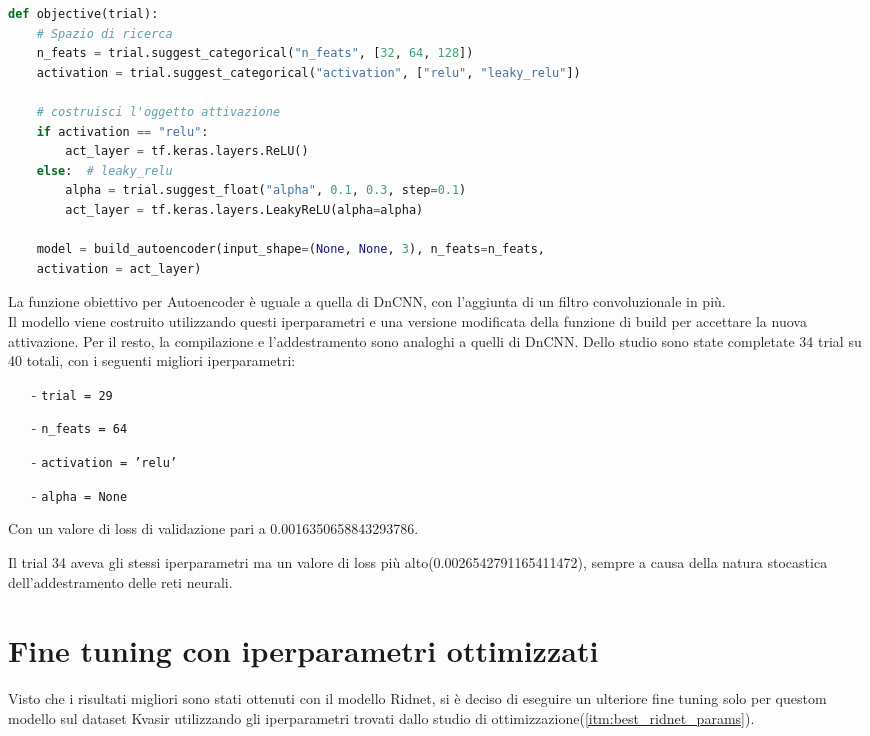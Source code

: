 \documentclass[12pt,a4paper,openright,twoside]{book}
\begin{document}
\begin{lstlisting}[language=Python, caption={Definizione della funzione obiettivo per Autoencoder}, label={lst:autoen_optuna_obj}]
def objective(trial):
    # Spazio di ricerca
    n_feats = trial.suggest_categorical("n_feats", [32, 64, 128])
    activation = trial.suggest_categorical("activation", ["relu", "leaky_relu"])

    # costruisci l'oggetto attivazione
    if activation == "relu":
        act_layer = tf.keras.layers.ReLU()
    else:  # leaky_relu
        alpha = trial.suggest_float("alpha", 0.1, 0.3, step=0.1)
        act_layer = tf.keras.layers.LeakyReLU(alpha=alpha)

    model = build_autoencoder(input_shape=(None, None, 3), n_feats=n_feats,
    activation = act_layer)
\end{lstlisting}
La funzione obiettivo per Autoencoder è uguale a quella di DnCNN, con l'aggiunta di un filtro convoluzionale in più.\\
Il modello viene costruito utilizzando questi iperparametri e una versione modificata della funzione di build per accettare la nuova attivazione.
Per il resto, la compilazione e l'addestramento sono analoghi a quelli di DnCNN.
Dello studio sono state completate 34 trial su 40 totali, con i seguenti migliori iperparametri:
\begin{itemize}
    \item [-] \texttt{trial = 29}
    \item [-] \texttt{n\_feats = 64}
    \item [-] \texttt{activation = 'relu'}
    \item [-] \texttt{alpha = None}
\end{itemize}
Con un valore di loss di validazione pari a 0.0016350658843293786.

Il trial 34 aveva gli stessi iperparametri ma un valore di loss più alto(0.0026542791165411472), sempre a causa della natura stocastica dell'addestramento delle reti neurali.

\section{Fine tuning con iperparametri ottimizzati}
Visto che i risultati migliori sono stati ottenuti con il modello Ridnet, si è deciso di eseguire un ulteriore fine tuning solo per questom modello sul dataset Kvasir utilizzando gli iperparametri trovati dallo studio di ottimizzazione(\ref{itm:best_ridnet_params}).\\
\end{document}
